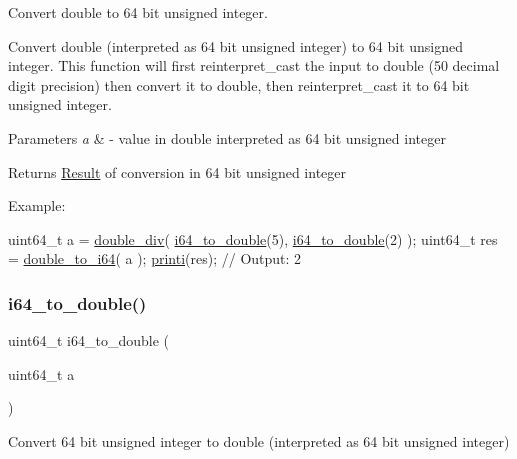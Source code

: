 Convert double to 64 bit unsigned integer. 

Convert double (interpreted as 64 bit unsigned integer) to 64 bit unsigned integer. This function will first reinterpret\+\_\+cast the input to double (50 decimal digit precision) then convert it to double, then reinterpret\+\_\+cast it to 64 bit unsigned integer. 
\begin{DoxyParams}{Parameters}
{\em a} & -\/ value in double interpreted as 64 bit unsigned integer \\
\hline
\end{DoxyParams}
\begin{DoxyReturn}{Returns}
\mbox{\hyperlink{struct_result}{Result}} of conversion in 64 bit unsigned integer
\end{DoxyReturn}
Example\+: 
\begin{DoxyCode}
uint64\_t a = \mbox{\hyperlink{group__mathcapi_gad67af06a6b0e9dbbf3be05d6bf99257c}{double\_div}}( \mbox{\hyperlink{group__mathcapi_gaec506d4ee77526e67ab5f2a8ef54f2b5}{i64\_to\_double}}(5), \mbox{\hyperlink{group__mathcapi_gaec506d4ee77526e67ab5f2a8ef54f2b5}{i64\_to\_double}}(2) );
uint64\_t res = \mbox{\hyperlink{group__mathcapi_ga1388e46084036133e57508c18590b1ed}{double\_to\_i64}}( a );
\mbox{\hyperlink{group__consolecapi_gaac924af668edbf421d478edf203fdbd1}{printi}}(res); \textcolor{comment}{// Output: 2}
\end{DoxyCode}
 \mbox{\label{group__mathcapi_gaec506d4ee77526e67ab5f2a8ef54f2b5}} 
\subsubsection{\texorpdfstring{i64\+\_\+to\+\_\+double()}{i64\_to\_double()}}
{\footnotesize\ttfamily uint64\+\_\+t i64\+\_\+to\+\_\+double (\begin{DoxyParamCaption}\item[{uint64\+\_\+t}]{a }\end{DoxyParamCaption})}



Convert 64 bit unsigned integer to double (interpreted as 64 bit unsigned integer) 

